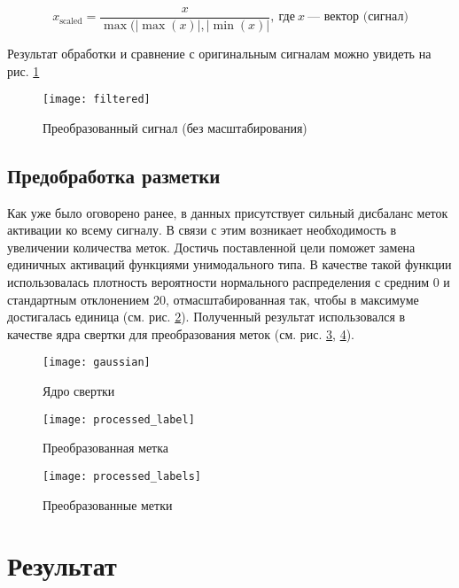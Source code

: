 \begin{equation} \label{eq:scaling}
	x_{\text{scaled}} = \frac{x}{\max(|\max(x)|, |\min(x)|}, \: \text{где} \: x \: \text{--- вектор (сигнал)}
\end{equation}

\noindent Результат обработки и сравнение с оригинальным сигналам можно увидеть
на рис. \ref{fig:filtered}

\begin{figure}[!htb]
	\centering
	\texttt{[image: filtered]}
	\caption{Преобразованный сигнал (без масштабирования)}
	\label{fig:filtered}
\end{figure}

\subsection{Предобработка разметки} Как уже было оговорено ранее, в данных
присутствует сильный дисбаланс меток активации ко всему сигналу. В связи с этим
возникает необходимость в увеличении количества меток. Достичь поставленной
цели поможет замена единичных активаций функциями унимодального типа. В
качестве такой функции использовалась плотность вероятности нормального
распределения с средним 0 и стандартным отклонением 20, отмасштабированная так,
чтобы в максимуме достигалась единица (см. рис. \ref{fig:gaussian}). Полученный
результат использовался в качестве ядра свертки для преобразования меток (см.
рис. \ref{fig:processed-label}, \ref{fig:processed-labels}).


\begin{figure}[!htb]
	\centering
	\texttt{[image: gaussian]}
	\caption{Ядро свертки}
	\label{fig:gaussian}
\end{figure}

\begin{figure}[!htb]
	\centering
	\texttt{[image: processed\_label]}
	\caption{Преобразованная метка}
	\label{fig:processed-label}
\end{figure}

\begin{figure}[!htb]
	\centering
	\texttt{[image: processed\_labels]}
	\caption{Преобразованные метки}
	\label{fig:processed-labels}
\end{figure}


\section{Результат}

